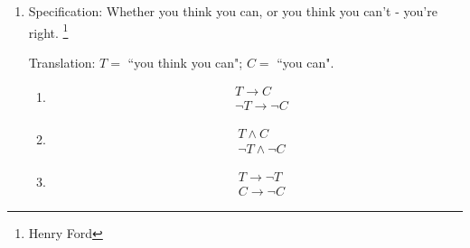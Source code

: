 \documentclass[12pt, oneside]{article}
\begin{document}
\begin{enumerate}
\begin{enumerate}
\begin{enumerate}
    Translation: $M =$ ``the computer is  out of memory"; $N = $ ``network connectivity
    is unreliable"; $D = $  ``disk errors  can occur".

    \begin{multicols}{3}
    \begin{enumerate}
        \item[] \begin{align*} &\neg M \to  N  \\ & \neg D \to M \\ & D \to N \end{align*}
        \item[] \begin{align*} &M \to  \neg N  \\ & \neg D \wedge M \\ & N \to D \end{align*}
        \item[] \begin{align*} &M \to  N  \\ &  M \to \neg D \\ & \neg  N \to \neg D \end{align*}
    \end{enumerate}
    \end{multicols}
    
    \item Specification: Whether you think you can, or you think you can't - you're right.
\footnote{Henry Ford}
    
    Translation: $T =$ ``you  think  you  can"; $C = $  ``you  can".
    
    \begin{multicols}{3}
    \begin{enumerate}
        \item[] \begin{align*} &T \to C \\&  \neg T \to \neg C \end{align*}
        \item[] \begin{align*} &T \wedge C \\  & \neg  T \wedge \neg C \end{align*}
        \item[] \begin{align*} &T \to \neg T  \\ & C  \to \neg  C \end{align*}
    \end{enumerate}
    \end{multicols}


\end{enumerate}
\end{enumerate}
\end{enumerate}
\end{document}
